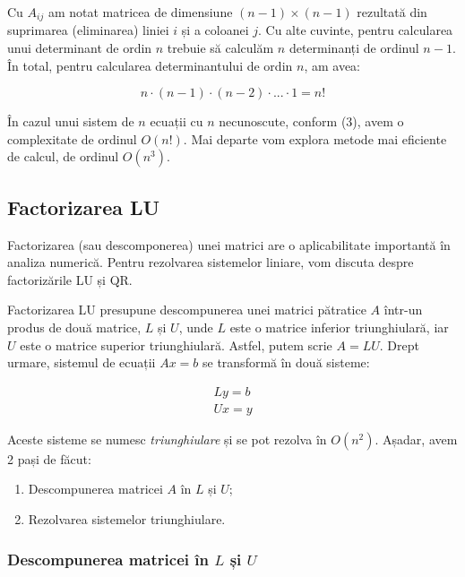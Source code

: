 \documentclass{exam}
\begin{document}
\par Cu $A_{ij}$ am notat matricea de dimensiune $(n - 1) \times (n - 1)$
rezultată din suprimarea (eliminarea) liniei $i$ și a coloanei $j$. Cu alte
cuvinte, pentru calcularea unui determinant de ordin $n$ trebuie să calculăm
$n$ determinanți de ordinul $n - 1$. În total, pentru calcularea determinantului
de ordin $n$, am avea:

\begin{equation}
	n \cdot (n - 1) \cdot (n - 2) \cdot ... \cdot 1 = n!
\end{equation}

\par În cazul unui sistem de $n$ ecuații cu $n$ necunoscute, conform (3),
avem o complexitate de ordinul $O(n!)$. Mai departe vom explora metode mai
eficiente de calcul, de ordinul $O(n^3)$.

\newpage
\subsection{Factorizarea LU}

\par Factorizarea (sau descomponerea) unei matrici are o aplicabilitate importantă
în analiza numerică. Pentru rezolvarea sistemelor liniare, vom discuta despre
factorizările LU și QR.

\par Factorizarea LU presupune descompunerea unei matrici pătratice $A$ într-un
produs de două matrice, $L$ și $U$, unde $L$ este o matrice inferior
triunghiulară, iar $U$ este o matrice superior triunghiulară. Astfel, putem
scrie $A = LU$. Drept urmare, sistemul de ecuații $Ax = b$ se transformă în două
sisteme:

\begin{gather*}
	Ly = b \\
	Ux = y
\end{gather*}

\par Aceste sisteme se numesc \textit{triunghiulare} și se pot rezolva în $O(n^2)$.
Așadar, avem 2 pași de făcut:

\begin{enumerate}
	\item Descompunerea matricei $A$ în $L$ și $U$;
	\item Rezolvarea sistemelor triunghiulare.
\end{enumerate}

\subsubsection{Descompunerea matricei în $L$ și $U$}
\end{document}
